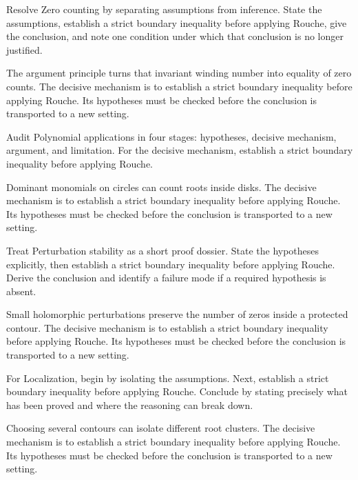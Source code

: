 \begin{problem}\label{prob:iv13-problem-03}
Resolve Zero counting by separating assumptions from inference. State the assumptions, establish a strict boundary inequality before applying Rouche, give the conclusion, and note one condition under which that conclusion is no longer justified.
\end{problem}
\begin{solution}
The argument principle turns that invariant winding number into equality of zero counts. The decisive mechanism is to establish a strict boundary inequality before applying Rouche. Its hypotheses must be checked before the conclusion is transported to a new setting.
\end{solution}

\begin{problem}\label{prob:iv13-problem-04}
Audit Polynomial applications in four stages: hypotheses, decisive mechanism, argument, and limitation. For the decisive mechanism, establish a strict boundary inequality before applying Rouche.
\end{problem}
\begin{solution}
Dominant monomials on circles can count roots inside disks. The decisive mechanism is to establish a strict boundary inequality before applying Rouche. Its hypotheses must be checked before the conclusion is transported to a new setting.
\end{solution}

\begin{problem}\label{prob:iv13-problem-05}
Treat Perturbation stability as a short proof dossier. State the hypotheses explicitly, then establish a strict boundary inequality before applying Rouche. Derive the conclusion and identify a failure mode if a required hypothesis is absent.
\end{problem}
\begin{solution}
Small holomorphic perturbations preserve the number of zeros inside a protected contour. The decisive mechanism is to establish a strict boundary inequality before applying Rouche. Its hypotheses must be checked before the conclusion is transported to a new setting.
\end{solution}

\begin{problem}\label{prob:iv13-problem-06}
For Localization, begin by isolating the assumptions. Next, establish a strict boundary inequality before applying Rouche. Conclude by stating precisely what has been proved and where the reasoning can break down.
\end{problem}
\begin{solution}
Choosing several contours can isolate different root clusters. The decisive mechanism is to establish a strict boundary inequality before applying Rouche. Its hypotheses must be checked before the conclusion is transported to a new setting.
\end{solution}

